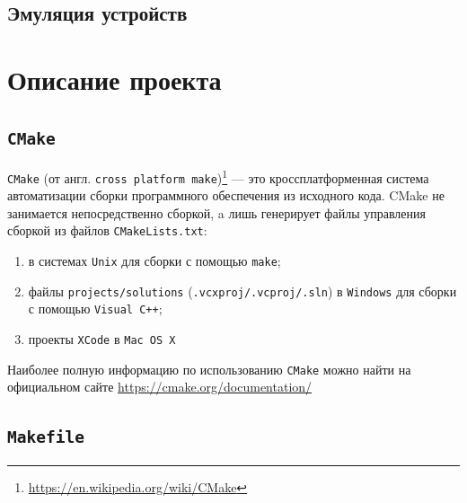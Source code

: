 \documentclass[12pt, twoside]{report}
\begin{document}
\section*{Эмуляция устройств}

\newpage
\chapter*{Описание проекта}

\section*{\texttt{CMake}}

\texttt{CMake} (от англ. \texttt{cross platform make})\footnote{\url{ https://en.wikipedia.org/wiki/CMake}} — это кроссплатформенная система автоматизации 
сборки программного обеспечения из исходного кода. CMake не занимается непосредственно сборкой, a лишь генерирует файлы управления 
сборкой из файлов \texttt{CMakeLists.txt}:
\begin{enumerate}
	\item {} в системах \texttt{Unix} для сборки с помощью \texttt{make};
	\item файлы \texttt{projects/solutions} (\texttt{.vcxproj/.vcproj/.sln}) в \texttt{Windows} для сборки с помощью \texttt{Visual C++};
	\item проекты \texttt{XCode} в \texttt{Mac OS X}
\end{enumerate}

Наиболее полную информацию по использованию \texttt{CMake} можно найти на официальном сайте \url{ https://cmake.org/documentation/}










\section*{\texttt{Makefile}}\label{Makefile}
\end{document}
